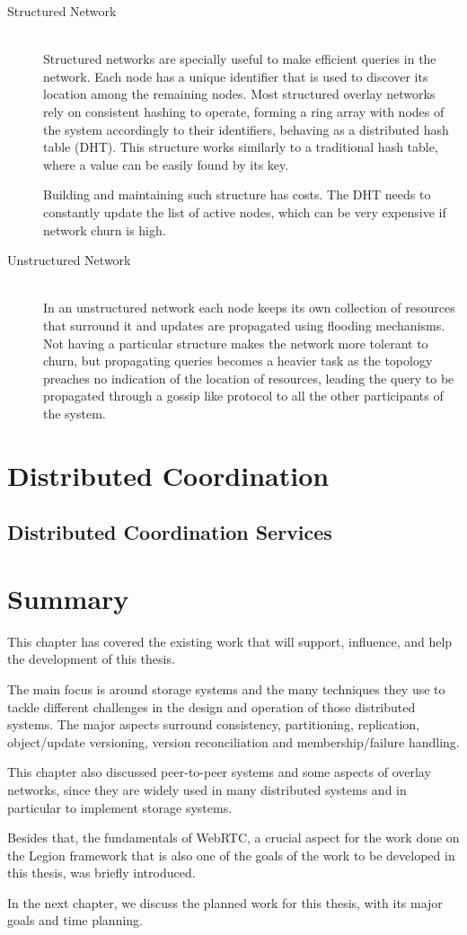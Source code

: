 \begin{description}
\item[Structured Network] \hfill \\
Structured networks are specially useful to make efficient queries in the network. Each node has a unique identifier that is used to discover its location among the remaining nodes. Most structured overlay networks rely on consistent hashing to operate, forming a ring array with nodes of the system accordingly to their identifiers, behaving as a distributed hash table (DHT). This structure works similarly to a traditional hash table, where a value can be easily found by its key.\par
	Building and maintaining such structure has costs. The DHT needs to constantly update the list of active nodes, which can be very expensive if network churn is high.

\item[Unstructured Network] \hfill \\
In an unstructured network each node keeps its own collection of resources that surround it and updates are propagated using flooding mechanisms. Not having a particular structure makes the network more tolerant to churn, but propagating queries becomes a heavier task as the topology preaches no indication of the location of resources, leading the query to be propagated through a gossip like protocol to all the other participants of the system.
\end{description}
	
\section{Distributed Coordination}
\label{sec:distributed_coordination}

\subsection{Distributed Coordination Services}
	

\section{Summary}
\label{sec:summary}
This chapter has covered the existing work that will support, influence, and help the development of this thesis.\par
	The main focus is around storage systems and the many techniques they use to tackle different challenges in the design and operation of those distributed systems. The major aspects surround consistency, partitioning, replication, object/update versioning, version reconciliation and membership/failure handling.\par
	This chapter also discussed peer-to-peer systems and some aspects of overlay networks, since they are widely used in many distributed systems and in particular to implement storage systems.\par
	Besides that, the fundamentals of WebRTC, a crucial aspect for the work done on the Legion framework that is also one of the goals of the work to be developed in this thesis, was briefly introduced.\par
	In the next chapter, we discuss the planned work for this thesis, with its major goals and time planning.